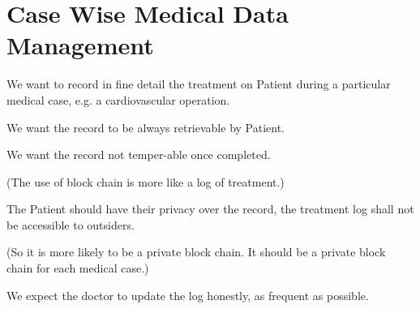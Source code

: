\documentclass[]{scrartcl}
\begin{document}
\section{Case Wise Medical Data Management}
We want to record in fine detail the treatment on Patient during a particular medical case, e.g. a cardiovascular operation.

We want the record to be always retrievable by Patient.

We want the record not temper-able once completed.

(The use of block chain is more like a log of treatment.)

The Patient should have their privacy over the record, the treatment log shall not be accessible to outsiders.

(So it is more likely to be a private block chain. It should be a private block chain for each medical case.)

We expect the doctor to update the log honestly, as frequent as possible.
 


\end{document}
